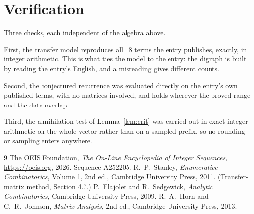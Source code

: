 \documentclass[11pt,a4paper]{article}
\theoremstyle{plain}
\theoremstyle{definition}
\begin{document}
\section{Verification}

Three checks, each independent of the algebra above.

First, the transfer model reproduces all $18$ terms the entry publishes, exactly, in
integer arithmetic. This is what ties the model to the entry: the digraph is built by reading
the entry's English, and a misreading gives different counts.

Second, the conjectured recurrence was evaluated directly on the entry's own published terms,
with no matrices involved, and holds wherever the proved range and the data overlap.

Third, the annihilation test of Lemma~\ref{lem:crit} was carried out in exact integer
arithmetic on the whole vector rather than on a sampled prefix, so no rounding or sampling
enters anywhere.

\begin{thebibliography}{9}
 The OEIS Foundation, \emph{The On-Line Encyclopedia of Integer
Sequences}, \url{https://oeis.org}, 2026. Sequence A252205.
 R.~P.~Stanley, \emph{Enumerative Combinatorics}, Volume 1, 2nd ed.,
Cambridge University Press, 2011. (Transfer-matrix method, Section 4.7.)
 P.~Flajolet and R.~Sedgewick, \emph{Analytic Combinatorics}, Cambridge
University Press, 2009.
 R.~A.~Horn and C.~R.~Johnson, \emph{Matrix Analysis}, 2nd ed., Cambridge
University Press, 2013.
\end{thebibliography}
\end{document}
